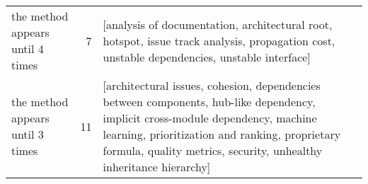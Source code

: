 \begin{tabular}{lrl}
  the method appears until 4 times &      7 &                                                                                                                                                                                                                                                                                                                                                                                                                                                                                                                                                                                                                                                                                                                                                                                                                                                                                                                                                                                                                                                                                                                                                                                                                                                                                                                                                                                         [analysis of documentation, architectural root, hotspot, issue track analysis, propagation cost, unstable dependencies, unstable interface] \\
  the method appears until 3 times &     11 &                                                                                                                                                                                                                                                                                                                                                                                                                                                                                                                                                                                                                                                                                                                                                                                                                                                                                                                                                                                                                                                                                                                                                                                                                                                                             [architectural issues, cohesion, dependencies between components, hub-like dependency, implicit cross-module dependency, machine learning, prioritization and ranking, proprietary formula, quality metrics, security, unhealthy inheritance hierarchy] \\

\end{tabular}
